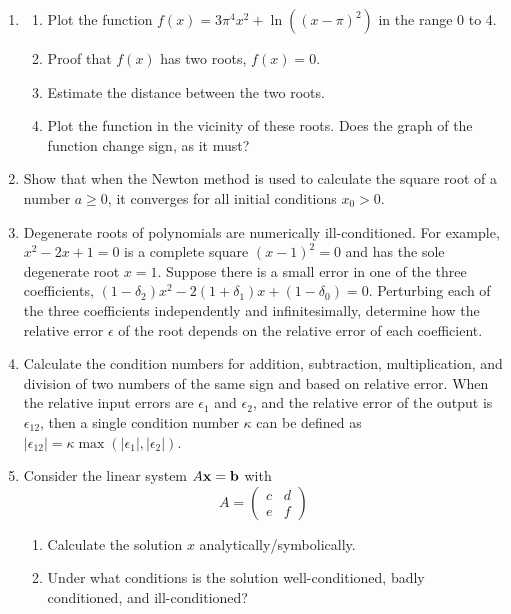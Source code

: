 \documentclass{article}
\begin{document}
\begin{enumerate}
\item \label{prbl:invisibleroot}
\begin{enumerate} \setlength{\itemsep}{0pt}
\item Plot the function  $f(x) = 3 \pi^4 x^2+\ln((x-\pi)^2)$ in the range 0 to 4.   %
\item Proof that $f(x)$ has two roots, $f(x)=0$.
\item Estimate the distance between the two roots. 
\item Plot the function in the vicinity of these roots.  Does the graph of the function change sign, as it must?
\end{enumerate}

\item Show that when the Newton method is used to calculate the square root of a number $a \geq 0$, it converges for all initial conditions $x_0 > 0$. 

\item
Degenerate roots of polynomials are numerically ill-conditioned.
For example, $x^2-2x+1=0$ is a complete square $(x-1)^2=0$ and has the sole degenerate root $x=1$.  
Suppose there is a small error in one of the three coefficients, $(1-\delta_2) x^2-2(1+\delta_1) x+(1-\delta_0)=0$.
Perturbing each of the three coefficients independently and infinitesimally, determine how the relative error $\epsilon$ of the root depends on the relative error of each coefficient. 

\item \label{prbl:cond4elemop}
  Calculate the condition numbers for addition, subtraction, multiplication, and division of two numbers of the same sign and based on relative error. When the relative input errors are $\epsilon_1$ and $\epsilon_2$, and the relative error of the output is $\epsilon_{12}$, then a single condition number $\kappa$ can be defined as $|\epsilon_{12}| = \kappa \max(|\epsilon_1|,|\epsilon_2|)$.

\item Consider the linear system $A{\bf x} = \bf b$ with
  \[
  A = \left( \begin{array}{cc} c & d \\
    e & f \end{array} \right)
  \]
    \begin{enumerate} \setlength{\itemsep}{0pt}
    \item Calculate the solution $x$ analytically/symbolically.
    \item Under what conditions is the solution well-conditioned, badly conditioned, and ill-conditioned?
    \end{enumerate}
  
\end{enumerate}
\end{document}
